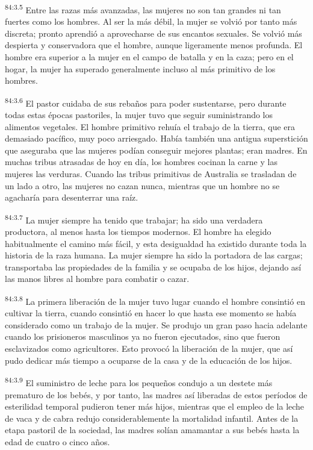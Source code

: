 \documentclass[twoside, 11pt]{book}
\begin{document}
\par
\textsuperscript{84:3.5} Entre las razas más avanzadas, las mujeres no son tan grandes ni tan fuertes como los hombres. Al ser la más débil, la mujer se volvió por tanto más discreta; pronto aprendió a aprovecharse de sus encantos sexuales. Se volvió más despierta y conservadora que el hombre, aunque ligeramente menos profunda. El hombre era superior a la mujer en el campo de batalla y en la caza; pero en el hogar, la mujer ha superado generalmente incluso al más primitivo de los hombres.

\par
\textsuperscript{84:3.6} El pastor cuidaba de sus rebaños para poder sustentarse, pero durante todas estas épocas pastoriles, la mujer tuvo que seguir suministrando los alimentos vegetales. El hombre primitivo rehuía el trabajo de la tierra, que era demasiado pacífico, muy poco arriesgado. Había también una antigua superstición que aseguraba que las mujeres podían conseguir mejores plantas; eran madres. En muchas tribus atrasadas de hoy en día, los hombres cocinan la carne y las mujeres las verduras. Cuando las tribus primitivas de Australia se trasladan de un lado a otro, las mujeres no cazan nunca, mientras que un hombre no se agacharía para desenterrar una raíz.

\par
\textsuperscript{84:3.7} La mujer siempre ha tenido que trabajar; ha sido una verdadera productora, al menos hasta los tiempos modernos. El hombre ha elegido habitualmente el camino más fácil, y esta desigualdad ha existido durante toda la historia de la raza humana. La mujer siempre ha sido la portadora de las cargas; transportaba las propiedades de la familia y se ocupaba de los hijos, dejando así las manos libres al hombre para combatir o cazar.

\par
\textsuperscript{84:3.8} La primera liberación de la mujer tuvo lugar cuando el hombre consintió en cultivar la tierra, cuando consintió en hacer lo que hasta ese momento se había considerado como un trabajo de la mujer. Se produjo un gran paso hacia adelante cuando los prisioneros masculinos ya no fueron ejecutados, sino que fueron esclavizados como agricultores. Esto provocó la liberación de la mujer, que así pudo dedicar más tiempo a ocuparse de la casa y de la educación de los hijos.

\par
\textsuperscript{84:3.9} El suministro de leche para los pequeños condujo a un destete más prematuro de los bebés, y por tanto, las madres así liberadas de estos períodos de esterilidad temporal pudieron tener más hijos, mientras que el empleo de la leche de vaca y de cabra redujo considerablemente la mortalidad infantil. Antes de la etapa pastoril de la sociedad, las madres solían amamantar a sus bebés hasta la edad de cuatro o cinco años.
\end{document}
